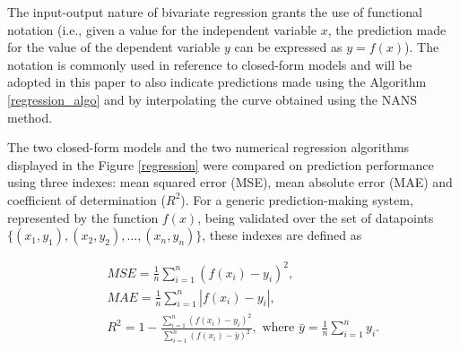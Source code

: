 \documentclass[10pt,final]{siamltex}
\begin{document}
The input-output nature of bivariate regression grants the use of functional notation (i.e., given a value for the independent variable $x$, the prediction made for the value of the dependent variable $y$ can be expressed as $y = f(x)$).
The notation is commonly used in reference to closed-form models and will be adopted in this paper to also indicate predictions made using the Algorithm \ref{regression_algo} and by interpolating the curve obtained using the NANS method.

The two closed-form models and the two numerical regression algorithms displayed in the Figure \ref{regression} were compared on prediction performance using three indexes: mean squared error (MSE), mean absolute error (MAE) and coefficient of determination ($R^2$).
For a generic prediction-making system, represented by the function $f(x)$, being validated over the set of datapoints $\lbrace(x_1,y_1), (x_2,y_2), \ldots, (x_n,y_n)\rbrace$, these indexes are defined as

\begin{eqnarray}
  &&\textit{MSE} = \frac{1}{n}\sum_{i=1}^{n}{(f(x_i)-y_i)^2},\\
  &&\textit{MAE} = \frac{1}{n}\sum_{i=1}^{n}{|f(x_i)-y_i|},\\
  &&R^2 = 1 - \frac{\sum_{i=1}^{n}{(f(x_i)-y_i)^2}}{\sum_{i=1}^{n}{(f(x_i)-\bar{y})^2}},
  \text{ where } \bar{y} = \frac{1}{n}\sum_{i=1}^{n}{y_i}.
\end{eqnarray}
\end{document}
